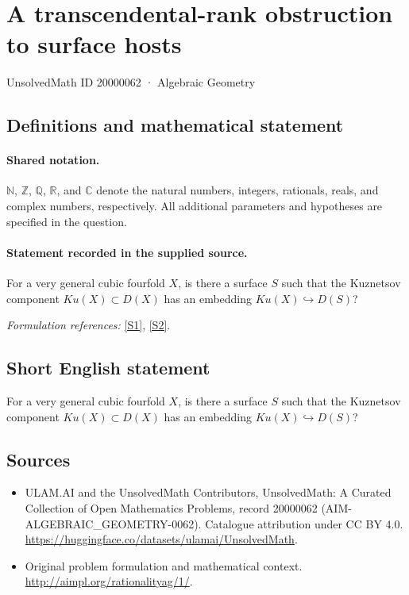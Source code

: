 \documentclass[11pt]{article}
\newcommand{\sref}[2]{\hyperlink{source:#1:#2}{[S#2]}}
\begin{document}
\setcounter{section}{20000061}
\section{A transcendental-rank obstruction to surface hosts}\label{20000062}
{\small UnsolvedMath ID 20000062 · Algebraic Geometry}
\subsection{Definitions and mathematical statement}

\paragraph{Shared notation.}$\mathbb N$, $\mathbb Z$, $\mathbb Q$, $\mathbb R$, and $\mathbb C$ denote the natural numbers, integers, rationals, reals, and complex numbers, respectively. All additional parameters and hypotheses are specified in the question.


\paragraph{Statement recorded in the supplied source.}
For a very general cubic fourfold $X$, is there a surface $S$ such that the Kuznetsov component $Ku(X) \subset D(X)$ has an embedding $Ku(X) \hookrightarrow D(S)$?
\par\smallskip\textit{Formulation references:} \sref{20000062}{1}, \sref{20000062}{2}.
\subsection{Short English statement}
For a very general cubic fourfold $X$, is there a surface $S$ such that the Kuznetsov component $Ku(X) \subset D(X)$ has an embedding $Ku(X) \hookrightarrow D(S)$?
\subsection{Sources}
\begin{itemize}
\item[\hypertarget{source:20000062:1}{S1}] ULAM.AI and the UnsolvedMath Contributors, UnsolvedMath: A Curated Collection of Open Mathematics Problems, record 20000062 (AIM-ALGEBRAIC\_GEOMETRY-0062). Catalogue attribution under CC BY 4.0.
\url{https://huggingface.co/datasets/ulamai/UnsolvedMath}.
\item[\hypertarget{source:20000062:2}{S2}] Original problem formulation and mathematical context.
\url{http://aimpl.org/rationalityag/1/}.
\end{itemize}
\label{end:20000062}
\end{document}
